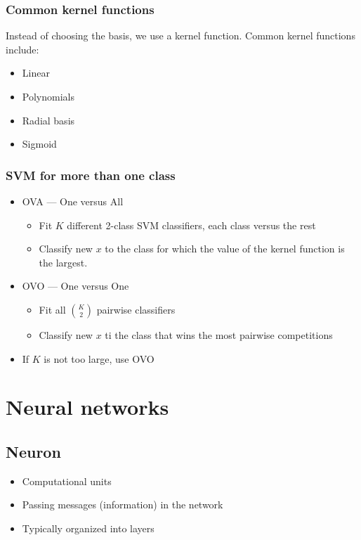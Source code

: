 \documentclass{article}
\begin{document}
        \subsubsection{Common kernel functions}
        Instead of choosing the basis, we use a kernel function.
        Common kernel functions include:
        \begin{itemize}
            \item Linear
            \item Polynomials
            \item Radial basis
            \item Sigmoid
        \end{itemize}

        \subsubsection{SVM for more than one class}
        \begin{itemize}
            \item OVA --- One versus All
            \begin{itemize}
                \item Fit $K$ different 2-class SVM classifiers, each class versus the rest
                \item Classify new $x$ to the class for which the value of the kernel function is the largest.
            \end{itemize}

            \item OVO --- One versus One
            \begin{itemize}
                \item Fit all $\binom{K}{2}$ pairwise classifiers
                \item Classify new $x$ ti the class that wins the most pairwise competitions
            \end{itemize}

            \item If $K$ is not too large, use OVO
        \end{itemize}

    \newpage

\section{Neural networks}
    \subsection{Neuron}
    \begin{itemize}
        \item Computational units
        \item Passing messages (information) in the network
        \item Typically organized into layers
    \end{itemize}
\end{document}
